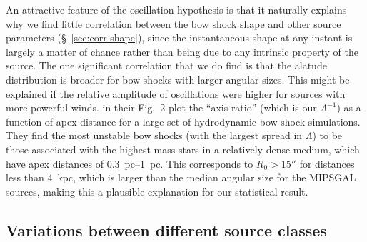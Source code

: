 An attractive feature of the oscillation hypothesis is that it
naturally explains why we find little correlation between the bow
shock shape and other source parameters (\S~\ref{sec:corr-shape}),
since the instantaneous shape at any instant is largely a matter of
chance rather than being due to any intrinsic property of the source.
The one significant correlation that we do find is that the alatude
distribution is broader for bow shocks with larger angular sizes.
This might be explained if the relative amplitude of oscillations were
higher for sources with more powerful winds. \citet{Meyer:2016a} in
their Fig.~2 plot the ``axis ratio'' (which is our \(\Lambda^{-1}\)) as a
function of apex distance for a large set of hydrodynamic bow shock
simulations.  They find the most unstable bow shocks (with the largest
spread in \(\Lambda\)) to be those associated with the highest mass stars in
a relatively dense medium, which have apex distances of
\SIrange{0.3}{1}{pc}.  This corresponds to \(R_0 > 15''\) for
distances less than \SI{4}{kpc}, which is larger than the median
angular size for the MIPSGAL sources, making this a plausible explanation for our statistical result.

\subsection{Variations between different source classes}
\label{sec:vari-betw-diff}


